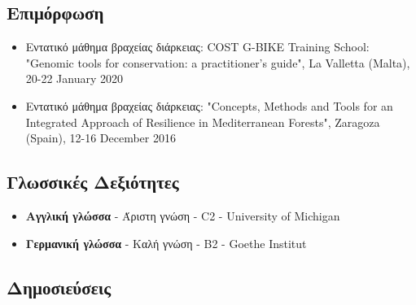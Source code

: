 \documentclass[12pt,]{scrartcl}
\begin{document}
\subsection{Επιμόρφωση}\label{courses}
\begin{itemize}
\vspace{-3mm}
\setlength\itemsep{-0.6em}

\item Εντατικό μάθημα βραχείας διάρκειας:
COST G-BIKE Training School: "Genomic tools for conservation: a practitioner’s guide", La Valletta (Malta), 20-22 January 2020

\item Εντατικό μάθημα βραχείας διάρκειας: "Concepts, Methods and Tools for an Integrated Approach of Resilience in Mediterranean Forests", Zaragoza (Spain), 12-16 December 2016

\end{itemize}

\subsection{Γλωσσικές Δεξιότητες}\label{Γλώσσες}
\begin{itemize}
\vspace{-3mm}
%
\setlength\itemsep{-0.6em}
\item \textbf{Αγγλική γλώσσα} - Άριστη γνώση - C2 - University of Michigan

\item \textbf{Γερμανική γλώσσα} - Καλή γνώση - Β2 - Goethe Institut
\end{itemize}



\subsection{Δημοσιεύσεις}\label{publications}
\end{document}
